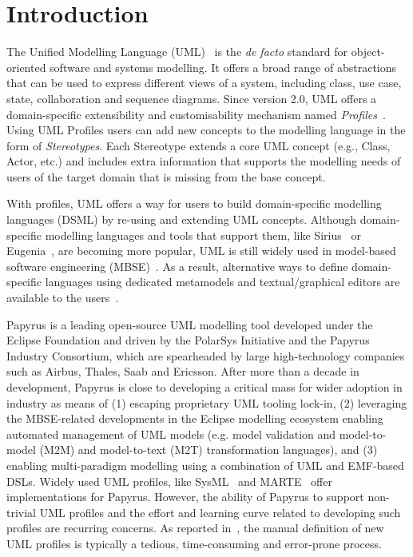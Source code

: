 \section{Introduction}
\label{sec:introduction}

The Unified Modelling Language (UML)~\cite{UML2015OMG} is the \emph{de facto} standard 
for object-oriented software and systems modelling. It offers a broad range of 
abstractions that can be used to express different views of a system, including 
class, use case, state, collaboration and sequence diagrams. Since version 2.0, 
UML offers a domain-specific extensibility and customisability mechanism named 
\emph{Profiles}~\cite{FuentesFernandez2004:UMLME}. Using UML Profiles users can 
add new concepts to the modelling 
language in the form of \textit{Stereotypes}. Each Stereotype extends a core 
UML concept (e.g., Class, Actor, etc.) and includes extra information that 
supports the modelling needs of users of the target domain that is missing from 
the base concept.

With profiles, UML offers a way for users to build 
domain-specific modelling languages (DSML) by re-using and extending UML 
concepts. 
Although domain-specific modelling languages and tools that support them, like 
Sirius~\cite{viyovic2014sirius} or Eugenia~\cite{kolovos2015eugenia}, are 
becoming more popular, UML is still widely used in model-based software 
engineering (MBSE)~\cite{erickson2007theoretical}. As a result, alternative 
ways to define domain-specific languages using dedicated metamodels and 
textual/graphical editors are available to the 
users~\cite{Bergmayr2014:MODELS,Pardillo2010:MODELS}. 

Papyrus \cite{lanusse2009papyrus} is a leading open-source UML modelling tool 
developed under the Eclipse Foundation and driven by the PolarSys Initiative 
and the Papyrus Industry Consortium, which are spearheaded by large 
high-technology companies such as Airbus, Thales, Saab and Ericsson. After more 
than a decade in development, Papyrus is close to developing a 
critical mass for wider adoption in industry as means of (1) escaping 
proprietary UML tooling lock-in, (2) leveraging the MBSE-related developments 
in the Eclipse modelling ecosystem enabling automated management of UML models 
(e.g. model validation and model-to-model (M2M) and model-to-text (M2T) transformation 
languages), and (3) enabling multi-paradigm modelling using a combination of 
UML and EMF-based DSLs. Widely used UML profiles, like 
SysML~\cite{friedenthal2014practical} and MARTE~\cite{omg2011marte} offer 
implementations for Papyrus. However, the ability of Papyrus to support 
non-trivial UML profiles and the effort and learning curve related to 
developing such profiles are recurring concerns. As reported 
in~\cite{Wimmer2009:IJWIS}, the manual definition of new UML profiles is 
typically a tedious, time-consuming and error-prone process.

